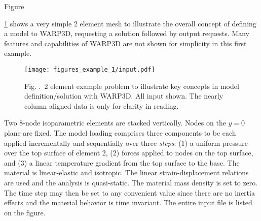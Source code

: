 \documentclass[11pt]{report}
\numberwithin{equation}{section}
\newcommand{\ti}{\emph}
\renewcommand{\thefigure}{\thesection.\arabic{figure}}
\begin{document}
Figure {\ref{fig:2elementinput}  shows a very simple 2 element mesh to 
illustrate the overall concept of
defining a model to WARP3D, requesting a solution followed by
output requests. Many features and 
capabilities of WARP3D are not shown for simplicity in this first
example.

%
\begin{figure}
\begin{center}
\texttt{[image: figures\_example\_1/input.pdf]} 
\caption{{\small Fig. \thefigure\ 2 element example problem to illustrate key concepts in
model definition/solution with WARP3D. All input shown. The nearly column aligned
data is only for clarity in reading.}
\label{fig:2elementinput}}
%
\end{center}
\end{figure}
%

Two 8-node isoparametric
elements are stacked vertically. Nodes on the $y=0$ plane are fixed. The model loading
comprises three components to be each applied incrementally and sequentially over
three \ti{steps}: (1) a uniform pressure over the
top surface of element 2, (2) forces applied to nodes on the top surface,
and (3) a linear temperature gradient  from the top surface to the base. The 
material is linear-elastic and isotropic. The linear strain-displacement relations
are used and the analysis is quasi-static. The
material mass density is set to zero. The time step may then be set to any
convenient value since there are no inertia effects and the material 
behavior is time invariant. The entire input file is listed on the figure. 

}
\end{document}
